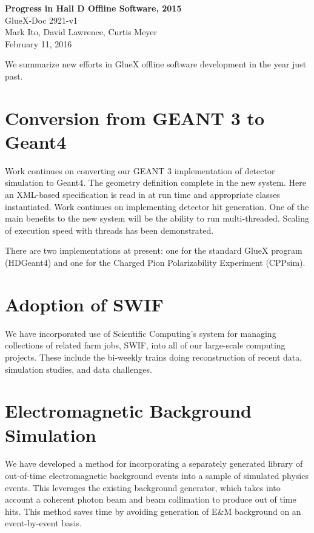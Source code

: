 \documentclass[12pt]{article}
\begin{document}
\begin{center}{\bf\LARGE
Progress in Hall D Offline Software, 2015} \\
\smallskip
{\large GlueX-Doc 2921-v1 \\
Mark Ito, David Lawrence, Curtis Meyer \\
February 11, 2016}
\end{center}

\medskip

We summarize new efforts in GlueX offline software development in the year just past.

\section{Conversion from GEANT 3 to Geant4}

Work continues on converting our GEANT 3 implementation of detector
simulation to Geant4. The geometry definition complete in the new
system. Here an XML-based specification is read in at run time and
appropriate classes instantiated. Work continues on implementing
detector hit generation. One of the main benefits to the new system
will be the ability to run multi-threaded. Scaling of execution speed
with threads has been demonstrated.

There are two implementations at present: one for the standard GlueX
program (HDGeant4)\cite{g4-gluex} and one for the Charged Pion
Polarizability Experiment (CPPsim)\cite{g4-cpp}.

\section{Adoption of SWIF}

We have incorporated use of Scientific Computing's system for managing
collections of related farm jobs, SWIF, into all of our large-scale
computing projects. These include the bi-weekly trains doing reconstruction of
recent data, simulation studies, and data challenges.

\section{Electromagnetic Background Simulation}

We have developed a method for incorporating a separately generated
library of out-of-time electromagnetic background events into a sample
of simulated physics events. This leverages the existing background
generator, which takes into account a coherent photon beam and beam
collimation to produce out of time hits. This method saves time by
avoiding generation of E\&M background on an event-by-event basis.
\end{document}
